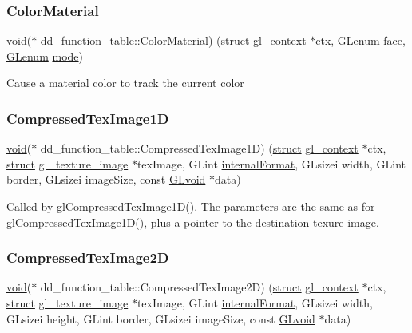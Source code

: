 \subsubsection{\texorpdfstring{Color\+Material}{ColorMaterial}}
{\footnotesize\ttfamily \hyperlink{interfacevoid}{void}($\ast$ dd\+\_\+function\+\_\+table\+::\+Color\+Material) (\hyperlink{interfacestruct}{struct} \hyperlink{structgl__context}{gl\+\_\+context} $\ast$ctx, \hyperlink{interfacevoid}{G\+Lenum} face, \hyperlink{interfacevoid}{G\+Lenum} \hyperlink{interfacevoid}{mode})}

Cause a material color to track the current color \mbox{\label{structdd__function__table_a3c38c3f19f2f4702cd4f239bbc29f012}} 
\subsubsection{\texorpdfstring{Compressed\+Tex\+Image1D}{CompressedTexImage1D}}
{\footnotesize\ttfamily \hyperlink{interfacevoid}{void}($\ast$ dd\+\_\+function\+\_\+table\+::\+Compressed\+Tex\+Image1D) (\hyperlink{interfacestruct}{struct} \hyperlink{structgl__context}{gl\+\_\+context} $\ast$ctx, \hyperlink{interfacestruct}{struct} \hyperlink{structgl__texture__image}{gl\+\_\+texture\+\_\+image} $\ast$tex\+Image, G\+Lint \hyperlink{interfacevoid}{internal\+Format}, G\+Lsizei width, G\+Lint border, G\+Lsizei image\+Size, const \hyperlink{interfacevoid}{G\+Lvoid} $\ast$data)}

Called by gl\+Compressed\+Tex\+Image1\+D(). The parameters are the same as for gl\+Compressed\+Tex\+Image1\+D(), plus a pointer to the destination texure image. \mbox{\label{structdd__function__table_ae8789f6fbfc35d057639ed8adbd58db2}} 
\subsubsection{\texorpdfstring{Compressed\+Tex\+Image2D}{CompressedTexImage2D}}
{\footnotesize\ttfamily \hyperlink{interfacevoid}{void}($\ast$ dd\+\_\+function\+\_\+table\+::\+Compressed\+Tex\+Image2D) (\hyperlink{interfacestruct}{struct} \hyperlink{structgl__context}{gl\+\_\+context} $\ast$ctx, \hyperlink{interfacestruct}{struct} \hyperlink{structgl__texture__image}{gl\+\_\+texture\+\_\+image} $\ast$tex\+Image, G\+Lint \hyperlink{interfacevoid}{internal\+Format}, G\+Lsizei width, G\+Lsizei height, G\+Lint border, G\+Lsizei image\+Size, const \hyperlink{interfacevoid}{G\+Lvoid} $\ast$data)}

